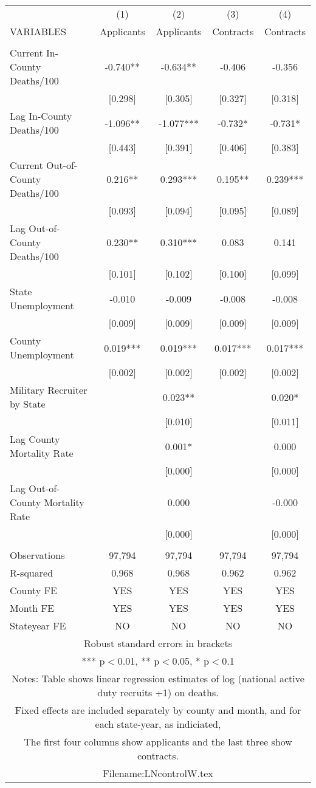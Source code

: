 \documentclass[]{article}
\begin{document}
\begin{tabular}{lcccc} \hline
 & (1) & (2) & (3) & (4) \\
VARIABLES & Applicants & Applicants & Contracts & Contracts \\ \hline
 &  &  &  &  \\
Current In-County Deaths/100 & -0.740** & -0.634** & -0.406 & -0.356 \\
 & [0.298] & [0.305] & [0.327] & [0.318] \\
Lag In-County Deaths/100 & -1.096** & -1.077*** & -0.732* & -0.731* \\
 & [0.443] & [0.391] & [0.406] & [0.383] \\
Current Out-of-County Deaths/100 & 0.216** & 0.293*** & 0.195** & 0.239*** \\
 & [0.093] & [0.094] & [0.095] & [0.089] \\
Lag Out-of-County Deaths/100 & 0.230** & 0.310*** & 0.083 & 0.141 \\
 & [0.101] & [0.102] & [0.100] & [0.099] \\
State Unemployment & -0.010 & -0.009 & -0.008 & -0.008 \\
 & [0.009] & [0.009] & [0.009] & [0.009] \\
County Unemployment & 0.019*** & 0.019*** & 0.017*** & 0.017*** \\
 & [0.002] & [0.002] & [0.002] & [0.002] \\
Military Recruiter by State &  & 0.023** &  & 0.020* \\
 &  & [0.010] &  & [0.011] \\
Lag County Mortality Rate &  & 0.001* &  & 0.000 \\
 &  & [0.000] &  & [0.000] \\
Lag Out-of-County Mortality Rate &  & 0.000 &  & -0.000 \\
 &  & [0.000] &  & [0.000] \\
 &  &  &  &  \\
Observations & 97,794 & 97,794 & 97,794 & 97,794 \\
R-squared & 0.968 & 0.968 & 0.962 & 0.962 \\
County FE & YES & YES & YES & YES \\
Month FE & YES & YES & YES & YES \\
 Stateyear FE & NO & NO & NO & NO \\ \hline
\multicolumn{5}{c}{ Robust standard errors in brackets} \\
\multicolumn{5}{c}{ *** p$<$0.01, ** p$<$0.05, * p$<$0.1} \\
\multicolumn{5}{c}{ Notes: Table shows linear regression estimates of log (national active duty recruits +1) on deaths.} \\
\multicolumn{5}{c}{ Fixed effects are included separately by county and month, and for each state-year, as indiciated,} \\
\multicolumn{5}{c}{ The first four columns show applicants and the last three show contracts.} \\
\multicolumn{5}{c}{ Filename:LNcontrolW.tex} \\
\end{tabular}
\end{document}
